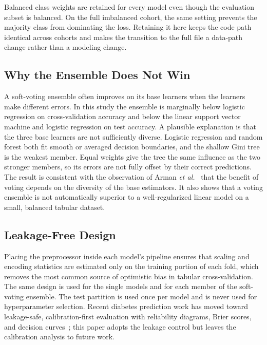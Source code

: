 \documentclass[conference]{IEEEtran}
\begin{document}
Balanced class weights are retained for every model even though the evaluation subset is balanced. On the full imbalanced cohort, the same setting prevents the majority class from dominating the loss. Retaining it here keeps the code path identical across cohorts and makes the transition to the full file a data-path change rather than a modeling change.

\subsection{Why the Ensemble Does Not Win}

A soft-voting ensemble often improves on its base learners when the learners make different errors. In this study the ensemble is marginally below logistic regression on cross-validation accuracy and below the linear support vector machine and logistic regression on test accuracy. A plausible explanation is that the three base learners are not sufficiently diverse. Logistic regression and random forest both fit smooth or averaged decision boundaries, and the shallow Gini tree is the weakest member. Equal weights give the tree the same influence as the two stronger members, so its errors are not fully offset by their correct predictions. The result is consistent with the observation of Arman \textit{et al.}~\cite{arman2025cjms} that the benefit of voting depends on the diversity of the base estimators. It also shows that a voting ensemble is not automatically superior to a well-regularized linear model on a small, balanced tabular dataset.

\subsection{Leakage-Free Design}

Placing the preprocessor inside each model's pipeline ensures that scaling and encoding statistics are estimated only on the training portion of each fold, which removes the most common source of optimistic bias in tabular cross-validation. The same design is used for the single models and for each member of the soft-voting ensemble. The test partition is used once per model and is never used for hyperparameter selection. Recent diabetes prediction work has moved toward leakage-safe, calibration-first evaluation with reliability diagrams, Brier scores, and decision curves~\cite{dellacorte2025calibration}; this paper adopts the leakage control but leaves the calibration analysis to future work.
\end{document}

